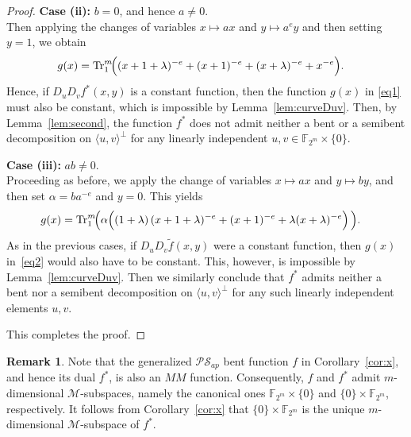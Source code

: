 \documentclass[12pt]{article}
\theoremstyle{plain}
\theoremstyle{definition}
\newtheorem{remark}{Remark}
\newcommand{\Tr}{{\rm Tr}}
\begin{document}
\begin{proof}
		\medskip
		
		\noindent \textbf{Case (ii):} $b=0$, and hence $a\neq 0$.  \\[.3em]
		Then applying the changes of variables $x\mapsto ax$ and $y\mapsto a^{e}y$ 
		and then setting $y=1$, we obtain
		\begin{align}\label{eq1}
			g(x)
			&=
			\Tr_1^{m}\!\Big(
			(x+1+\lambda)^{-e}
			+   (x+1)^{-e}
			+ (x+\lambda )^{-e}
			+ x^{-e}
			\Big).
		\end{align}
		Hence, if $D_u D_v f^{\ast}(x,y)$ is a constant function,
		then the function $g(x)$ in \eqref{eq1} must also be constant,
		which is impossible by Lemma~\ref{lem:curveDuv}. Then, by Lemma~\ref{lem:second}, the function $f^{*}$ does not admit neither a bent or a semibent decomposition on $\langle u,v\rangle^{\perp}$ for any linearly independent $u,v \in \mathbb{F}_{2^{m}} \times \{0\}$.
		
		\medskip
		
		\noindent \textbf{Case (iii):} $ab \neq 0$.  \\[.3em]
		Proceeding as before, we apply the change of variables $x \mapsto ax$ and
		$y \mapsto by$, and then set $\alpha = b a^{-e}$ and $y=0$. This yields
		\begin{align}\label{eq2}
			g(x)
			&=
			\Tr_1^{m}\!\Big(
			\alpha\Big(
			(1+\lambda)\,(x+1+\lambda)^{-e}
			+ (x+1)^{-e}
			+ \lambda (x+\lambda)^{-e}
			\Big)\,
			\Big).
		\end{align}
		As in the previous cases, if $D_u D_v \widetilde{f}(x,y)$ were a
		constant function, then $g(x)$ in~\eqref{eq2} would also
		have to be constant. This, however, is impossible by  Lemma~\ref{lem:curveDuv}. Then we similarly conclude that $f^{*}$ admits neither a bent nor a semibent decomposition on $\langle u,v\rangle^{\perp}$ for any such linearly independent elements $u,v$.
		
		\medskip
		
		This completes the proof.
	\end{proof}
	
	\begin{remark}
		Note that the generalized $\mathcal{PS}_{ap}$ bent function $f$ in
		Corollary~\ref{cor:x}, and hence its dual $f^{\ast}$, is also an $MM$ function.
		Consequently, $f$ and $f^{\ast}$ admit $m$-dimensional $\mathcal{M}$-subspaces,
		namely the canonical ones $\mathbb{F}_{2^{m}} \times \{0\}$ and
		$\{0\} \times \mathbb{F}_{2^{m}}$, respectively.
		It follows from Corollary~\ref{cor:x} that
		$\{0\} \times \mathbb{F}_{2^{m}}$ is the unique $m$-dimensional
		$\mathcal{M}$-subspace of $f^{\ast}$.
	\end{remark}
	
\end{document}
